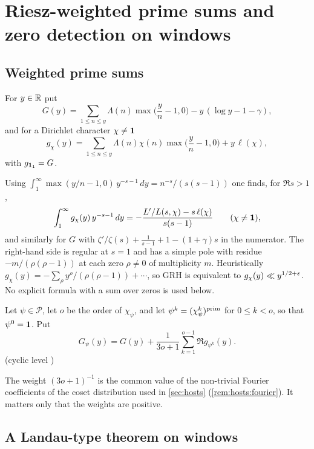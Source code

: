 \section{Riesz-weighted prime sums and zero detection on windows}\label{sec:landau}

\subsection{Weighted prime sums}

\begin{definition}\label{def:landau:G}
For $y\in\mathbb{R}$ put
\[
G(y)=\sum_{1\le n\le y}\Lambda(n)\max\Big(\frac yn-1,0\Big)-y\,(\log y-1-\gamma),
\]
and for a Dirichlet character $\chi\ne\mathbf{1}$
\[
g_\chi(y)=\sum_{1\le n\le y}\Lambda(n)\chi(n)\max\Big(\frac yn-1,0\Big)+y\,\ell(\chi),
\]
with $g_{\mathbf{1}_1}=G$.  
\end{definition}

Using $\int_1^\infty\max(y/n-1,0)\,y^{-s-1}\,dy=n^{-s}/(s(s-1))$ one finds, for $\Re s>1$,
\begin{equation}\label{eq:landau:mellin}
\int_1^\infty g_\chi(y)\,y^{-s-1}\,dy=-\frac{L'/L(s,\chi)-s\,\ell(\chi)}{s(s-1)}\qquad(\chi\ne\mathbf{1}),
\end{equation}
and similarly for $G$ with $\zeta'/\zeta(s)+\frac1{s-1}+1-(1+\gamma)s$ in the numerator. The right-hand
side is regular at $s=1$ and has a simple pole with residue $-m/(\rho(\rho-1))$ at each zero $\rho\neq0$
of multiplicity $m$. Heuristically $g_\chi(y)=-\sum_\rho y^\rho/(\rho(\rho-1))+\cdots$, so GRH is
equivalent to $g_\chi(y)\ll y^{1/2+\varepsilon}$. No explicit formula with a sum over zeros is used below.

\begin{definition}\label{def:landau:Gm}
Let $\psi\in\mathcal P$, let $o$ be the order of $\chi_\psi$, and let $\psi^k=(\chi_\psi^k)^{\rm prim}$
for $0\le k<o$, so that $\psi^0=\mathbf{1}$. Put
\[
G_\psi(y)=G(y)+\frac1{3o+1}\sum_{k=1}^{o-1}\Re g_{\psi^k}(y).
\]
 (cyclic level )
\end{definition}

The weight $(3o+1)^{-1}$ is the common value of the non-trivial Fourier coefficients of the coset
distribution used in \cref{sec:hosts} (\cref{rem:hosts:fourier}). It matters only that the weights are
positive.

\subsection{A Landau-type theorem on windows}

